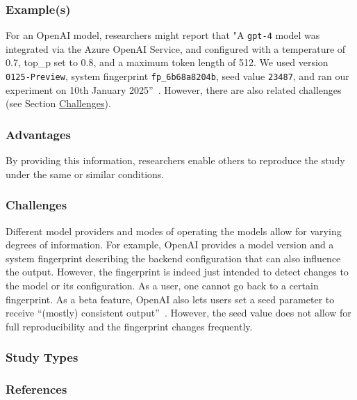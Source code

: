 \subsubsection{Example(s)}

For an OpenAI model, researchers might report that "A  \texttt{gpt-4} model was integrated via the Azure OpenAI Service, and configured with a temperature of 0.7, top\_p set to 0.8, and a maximum token length of 512. We used version \texttt{0125-Preview}, system fingerprint \texttt{fp\_6b68a8204b}, seed value \texttt{23487}, and ran our experiment on 10th January 2025''~\cite{OpenAI25, Azure25}.
However, there are also related challenges (see Section \href{/guidelines/#challenges-1}{Challenges}).



\subsubsection{Advantages}

By providing this information, researchers enable others to reproduce the study under the same or similar conditions.


\subsubsection{Challenges}

Different model providers and modes of operating the models allow for varying degrees of information.
For example, OpenAI provides a model version and a system fingerprint describing the backend configuration that can also influence the output.
However, the fingerprint is indeed just intended to detect changes to the model or its configuration.
As a user, one cannot go back to a certain fingerprint.
As a beta feature, OpenAI also lets users set a seed parameter to receive ``(mostly) consistent output''~\cite{OpenAI23}.
However, the seed value does not allow for full reproducibility and the fingerprint changes frequently. 



\subsubsection{Study Types}




\subsubsection{References}





